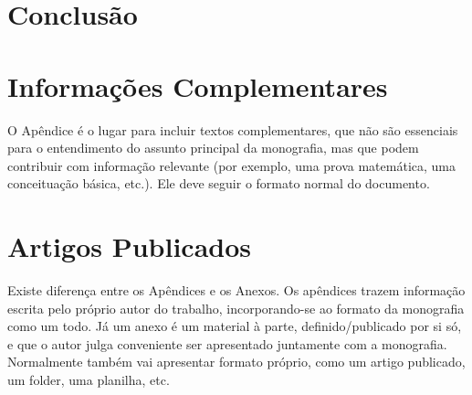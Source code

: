 \documentclass[twoside,english,brazilian]{UNISINOSmonografia}
\begin{document}
\chapter{Conclusão}




\appendix
\chapter{Informações Complementares}

O Apêndice é o lugar para incluir textos complementares, que não são essenciais para o entendimento do assunto principal da monografia, mas que podem contribuir com informação relevante (por exemplo, uma prova matemática, uma conceituação básica, etc.).  Ele deve seguir o formato normal do documento.

\annex
\chapter{Artigos Publicados}
Existe diferença entre os Apêndices e os Anexos.  Os apêndices trazem informação escrita pelo próprio autor do trabalho, incorporando-se ao formato da monografia como um todo.  Já um anexo é um material à parte, definido/publicado por si só, e que o autor julga conveniente ser apresentado juntamente com a monografia.  Normalmente também vai apresentar formato próprio, como um artigo publicado, um folder, uma planilha, etc.
\end{document}
